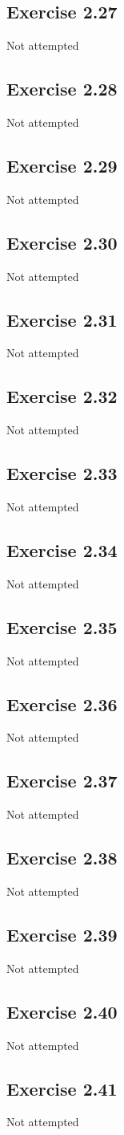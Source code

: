 \subsection{Exercise 2.27}
Not attempted

\subsection{Exercise 2.28}
Not attempted

\subsection{Exercise 2.29}
Not attempted

\subsection{Exercise 2.30}
Not attempted

\subsection{Exercise 2.31}
Not attempted

\subsection{Exercise 2.32}
Not attempted

\subsection{Exercise 2.33}
Not attempted

\subsection{Exercise 2.34}
Not attempted

\subsection{Exercise 2.35}
Not attempted

\subsection{Exercise 2.36}
Not attempted

\subsection{Exercise 2.37}
Not attempted

\subsection{Exercise 2.38}
Not attempted

\subsection{Exercise 2.39}
Not attempted

\subsection{Exercise 2.40}
Not attempted

\subsection{Exercise 2.41}
Not attempted
